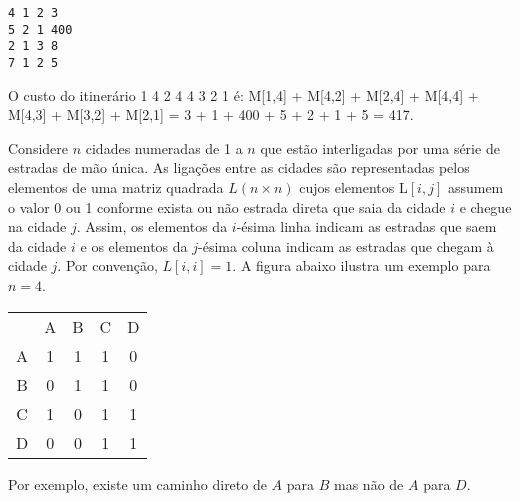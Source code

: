 \begin{verbatim}
4 1 2 3
5 2 1 400
2 1 3 8
7 1 2 5
\end{verbatim}

O custo do itinerário 1 4 2 4 4 3 2 1 é: 
M[1,4] + M[4,2] + M[2,4] + M[4,4] + M[4,3] + M[3,2] + M[2,1] =
3 + 1 + 400 + 5 + 2 + 1 + 5 = 417.


\item Considere $n$ cidades numeradas de 1 a $n$ que estão interligadas por
uma série de estradas de mão única. As ligações entre as cidades são 
representadas pelos elementos de uma matriz quadrada $L (n \times n)$ cujos
elementos L$[i,j]$ assumem o valor 0 ou 1 conforme exista ou não estrada
direta que saia da cidade $i$ e chegue na cidade $j$. Assim, os elementos
da $i$-ésima linha indicam as estradas que saem da cidade $i$ e os 
elementos da $j$-ésima coluna indicam as estradas que chegam à cidade $j$.
Por convenção, $L[i,i]=1$. A figura abaixo ilustra um exemplo para $n=4$.

\begin{center}
\begin{tabular}{ccccc}
  & A & B & C & D \\
A & 1 & 1 & 1 & 0 \\
B & 0 & 1 & 1 & 0 \\
C & 1 & 0 & 1 & 1 \\
D & 0 & 0 & 1 & 1 \\
\end{tabular}
\end{center}

Por exemplo, existe um caminho direto de $A$ para $B$ mas não de $A$ para $D$.


